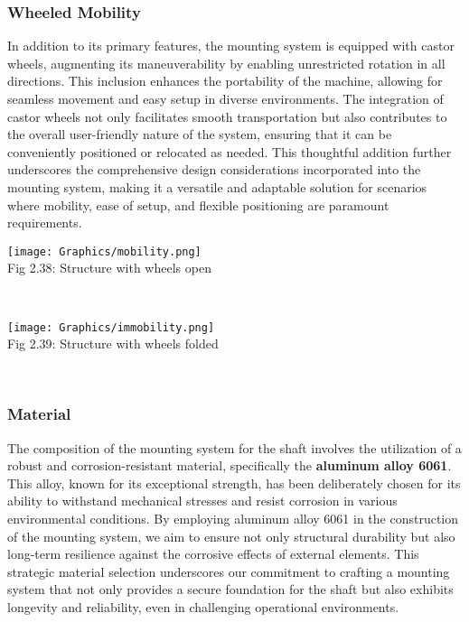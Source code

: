 \documentclass[a4,10pt]{report}
\begin{document}
\subsubsection{Wheeled Mobility}
In addition to its primary features, the mounting system is equipped with castor wheels, augmenting its maneuverability by enabling unrestricted rotation in all directions. This inclusion enhances the portability of the machine, allowing for seamless movement and easy setup in diverse environments. The integration of castor wheels not only facilitates smooth transportation but also contributes to the overall user-friendly nature of the system, ensuring that it can be conveniently positioned or relocated as needed. This thoughtful addition further underscores the comprehensive design considerations incorporated into the mounting system, making it a versatile and adaptable solution for scenarios where mobility, ease of setup, and flexible positioning are paramount requirements.
\begin{center}
    \texttt{[image: Graphics/mobility.png]} \\
    \normalsize{Fig 2.38: Structure with wheels open}
\end{center} \\

\begin{center}
    \texttt{[image: Graphics/immobility.png]} \\
    \normalsize{Fig 2.39: Structure with wheels folded}
\end{center} \\


\subsubsection{Material}
The composition of the mounting system for the shaft involves the utilization of a robust and corrosion-resistant material, specifically the \textbf{aluminum alloy 6061}. This alloy, known for its exceptional strength, has been deliberately chosen for its ability to withstand mechanical stresses and resist corrosion in various environmental conditions. By employing aluminum alloy 6061 in the construction of the mounting system, we aim to ensure not only structural durability but also long-term resilience against the corrosive effects of external elements. This strategic material selection underscores our commitment to crafting a mounting system that not only provides a secure foundation for the shaft but also exhibits longevity and reliability, even in challenging operational environments.
\end{document}
